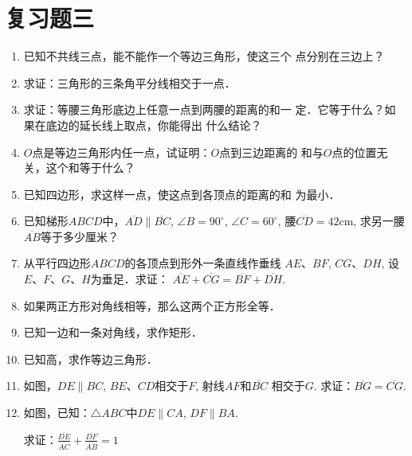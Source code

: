 \section*{复习题三}
\begin{enumerate}
    \item 已知不共线三点，能不能作一个等边三角形，使这三个
    点分别在三边上？
    \item 求证：三角形的三条角平分线相交于一点．
    \item 求证：等腰三角形底边上任意一点到两腰的距离的和一
    定．它等于什么？如果在底边的延长线上取点，你能得出
    什么结论？
    \item $O$点是等边三角形内任一点，试证明：$O$点到三边距离的
    和与$O$点的位置无关，这个和等于什么？
    \item 已知四边形，求这样一点，使这点到各顶点的距离的和
    为最小．
    \item 已知梯形$ABCD$中，$\overline{AD}\parallel\overline{BC}$, $\angle B=90^{\circ}$, 
    $\angle C=60^{\circ}$, 腰$\overline{CD}=42$cm, 求另一腰$\overline{AB}$等于多少厘米？
    \item 从平行四边形$ABCD$的各顶点到形外一条直线作垂线
    $AE$、$BF$, $CG$、$DH$, 设$E$、$F$、$G$、$H$为垂足．求证：
    $\overline{AE}+\overline{CG}=\overline{BF}+\overline{DH}$.
    \item 如果两正方形对角线相等，那么这两个正方形全等．
\item 已知一边和一条对角线，求作矩形．
\item 已知高，求作等边三角形．
\item 如图，$DE\parallel BC$, $BE$、$CD$相交于$F$, 射线$AF$和$\overline{BC}$
相交于$G$. 求证：$\overline{BG}=\overline{CG}$.
\item 如图，已知：$\triangle ABC$中$DE\parallel CA$, $DF\parallel BA$.

求证：$\frac{\overline{DE}}{\overline{AC}}+\frac{\overline{DF}}{\overline{AB}}=1$


\end{enumerate}
